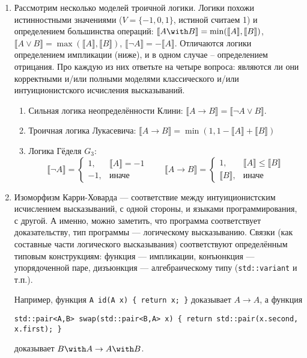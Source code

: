\documentclass[10pt,a4paper,oneside]{article}
\begin{document}
\begin{enumerate}
\item Рассмотрим несколько моделей троичной логики. Логики похожи истинностными значениями ($V = \{ -1, 0, 1 \}$, истиной считаем 1)
и определением большинства операций:
$\llbracket A \with B\rrbracket = \min(\llbracket A \rrbracket, \llbracket B \rrbracket)$,
$\llbracket A \vee B\rrbracket = \max(\llbracket A \rrbracket, \llbracket B \rrbracket)$,
$\llbracket \neg A\rrbracket = -\llbracket A \rrbracket$. Отличаются логики определением импликации (ниже), и в одном случае -- определением отрицания.
Про каждую из них ответьте на четыре вопроса:
являются ли они корректными и/или полными моделями классического и/или интуиционистского исчисления высказываний.

\begin{enumerate}
\item Сильная логика неопределённости Клини: $\llbracket A \rightarrow B \rrbracket = \llbracket \neg A \vee B \rrbracket$.
\item Троичная логика Лукасевича: $\llbracket A \rightarrow B \rrbracket = \min(1,1 -\llbracket A \rrbracket + \llbracket B \rrbracket)$
\item Логика Гёделя $G_3$: $$\llbracket \neg A \rrbracket = \left\{\begin{array}{ll}1,& \llbracket A \rrbracket = -1\\-1,&\text{иначе} \end{array}\right.
  \quad\quad \llbracket A \rightarrow B \rrbracket = \left\{\begin{array}{ll}1,& \llbracket A \rrbracket \le \llbracket B \rrbracket \\\llbracket B \rrbracket,&\text{иначе}\end{array}\right.$$
\end{enumerate}

\item Изоморфизм Карри-Ховарда --- соответствие между интуиционистским исчислением высказываний, с одной стороны, и 
языками программирования, с другой. А именно, можно заметить, что программа соответствует доказательству, тип программы --- 
логическому высказыванию. Связки (как составные части логического высказывания) соответствуют определённым типовым конструкциям:
функция --- импликации, конъюнкция --- упорядоченной паре, дизъюнкция --- алгебраическому типу (\verb!std::variant! и т.п.).

Например, функция \verb!A id(A x) { return x; }! доказывает $A \rightarrow A$, а функция 
\begin{verbatim}
std::pair<A,B> swap(std::pair<B,A> x) { return std::pair(x.second, x.first); }
\end{verbatim}
доказывает $B\with A \rightarrow A \with B$.


\end{enumerate}
\end{document}
